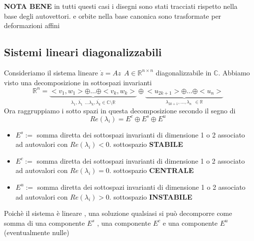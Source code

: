 \documentclass{article}
\theoremstyle{definition}
\newcommand{\R}{\mathbb{R}}
\newcommand{\Rn}{\R^n}
\newcommand{\la}{\lambda}
\begin{document}
\textbf{NOTA BENE} in tutti questi casi  i disegni sono stati tracciati rispetto nella base degli autovettori. e orbite nella base canonica sono trasformate per deformazioni affini 

\subsection{Sistemi lineari diagonalizzabili}
Consideriamo il sistema lineare $\dot{z}=Az \ \ A \in \R^{n\times n}$ diagonalizzabile in $\mathbb{C}$. Abbiamo visto una decomposizione in sottospazi invarianti 
$$\Rn = \underbrace{<v_1,w_1> \oplus \dots \oplus <v_k,w_k>}_{\la_1 , \overline{\la_1} \ \ \dots \la_k , \overline{\la_k} \in \mathbb{C} \setminus \R } \oplus \underbrace{<u_{2k+1}> \oplus \dots \oplus< u_n >}_{\la_{2k+1} , \dots  ,\la_n \ \ \in \R}  $$
Ora raggruppiamo i sotto spazi in questa decomposizione secondo il segno di $$Re(\la_i)=E^c \oplus E^s \oplus E^u$$
\begin{itemize}
	\item  $E^s :=$ somma diretta dei sottospazi invarianti di dimensione 1 o 2 associato ad autovalori con $Re(\la_i)<0$. sottospazio \textbf{STABILE}
	\item  $E^c :=$ somma diretta dei sottospazi invarianti di dimensione 1 o 2 associato ad autovalori con $Re(\la_i)=0$. sottospazio \textbf{CENTRALE}
	\item  $E^u :=$ somma diretta dei sottospazi invarianti di dimensione 1 o 2 associato ad autovalori con $Re(\la_i)>0$. sottospazio \textbf{INSTABILE}
\end{itemize}
Poichè il sistema è lineare , una soluzione qualsiasi si può decomporre come somma di una componente $E^s$ , una componente $E^c$ e una componente $E^u$ (eventualmente nulle)
\end{document}
